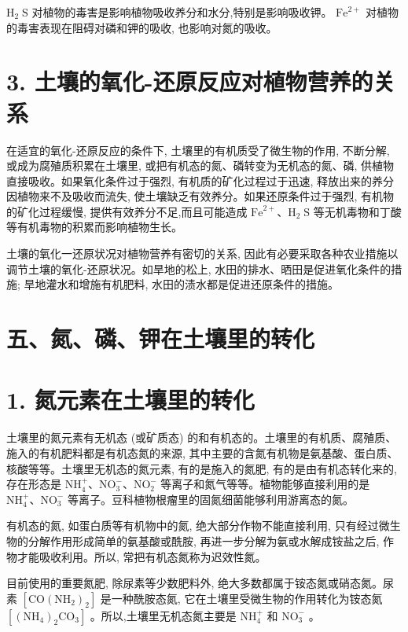 \documentclass[10pt]{article}
\begin{document}
\({\mathrm{H}}_{2}\mathrm{\;S}\) 对植物的毒害是影响植物吸收养分和水分,特别是影响吸收钾。 \({\mathrm{{Fe}}}^{2 + }\) 对植物的毒害表现在阻碍对磷和钾的吸收, 也影响对氮的吸收。

\section*{3. 土壤的氧化-还原反应对植物营养的关系}

在适宜的氧化-还原反应的条件下, 土壤里的有机质受了微生物的作用, 不断分解, 或成为腐殖质积累在土壤里, 或把有机态的氮、磷转变为无机态的氮、磷, 供植物直接吸收。如果氧化条件过于强烈, 有机质的矿化过程过于迅速, 释放出来的养分因植物来不及吸收而流失, 使土壤缺乏有效养分。如果还原条件过于强烈, 有机物的矿化过程缓慢, 提供有效养分不足,而且可能造成 \({\mathrm{{Fe}}}^{2 + }\text{、}{\mathrm{H}}_{2}\mathrm{\;S}\) 等无机毒物和丁酸等有机毒物的积累而影响植物生长。

土壤的氧化一还原状况对植物营养有密切的关系, 因此有必要采取各种农业措施以调节土壤的氧化-还原状况。如旱地的松上, 水田的排水、晒田是促进氧化条件的措施; 旱地灌水和增施有机肥料, 水田的渍水都是促进还原条件的措施。

\section*{五、氮、磷、钾在土壤里的转化}

\section*{1. 氮元素在土壤里的转化}

土壤里的氮元素有无机态 (或矿质态) 的和有机态的。土壤里的有机质、腐殖质、施入的有机肥料都是有机态氮的来源, 其中主要的含氮有机物是氨基酸、蛋白质、核酸等等。土壤里无机态的氮元素, 有的是施入的氮肥, 有的是由有机态转化来的,存在形态是 \({\mathrm{{NH}}}_{4}^{ + }\text{、}{\mathrm{{NO}}}_{3}^{ - }\text{、}{\mathrm{{NO}}}_{2}^{ - }\) 等离子和氮气等等。植物能够直接利用的是 \({\mathrm{{NH}}}_{4}^{ + }\text{、}{\mathrm{{NO}}}_{3}^{ - }\) 等离子。豆科植物根瘤里的固氮细菌能够利用游离态的氮。

有机态的氮, 如蛋白质等有机物中的氮, 绝大部分作物不能直接利用, 只有经过微生物的分解作用形成简单的氨基酸或酰胺, 再进一步分解为氨或水解成铵盐之后, 作物才能吸收利用。所以, 常把有机态氮称为迟效性氮。

目前使用的重要氮肥, 除尿素等少数肥料外, 绝大多数都属于铵态氮或硝态氮。尿素 \(\left\lbrack {\mathrm{{CO}}{\left( {\mathrm{{NH}}}_{2}\right) }_{2}}\right\rbrack\) 是一种酰胺态氮, 它在土壤里受微生物的作用转化为铵态氮 \(\left\lbrack {{\left( {\mathrm{{NH}}}_{4}\right) }_{2}{\mathrm{{CO}}}_{3}}\right\rbrack\) 。所以,土壤里无机态氮主要是 \({\mathrm{{NH}}}_{4}^{ + }\) 和 \({\mathrm{{NO}}}_{3}^{ - }\) 。
\end{document}
